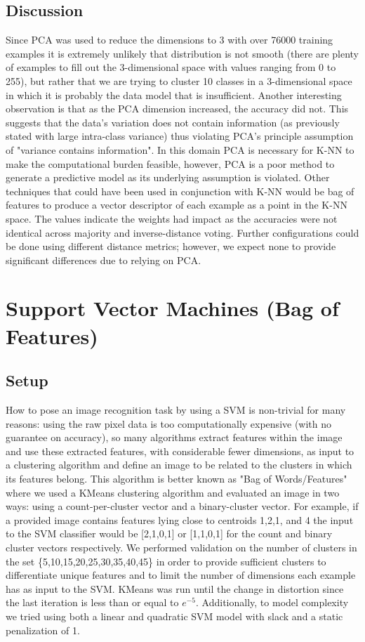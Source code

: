 \documentclass{article} %
\begin{document}
\subsection{Discussion}
Since PCA was used to reduce the dimensions to 3 with over 76000 training examples it is extremely unlikely that distribution is not smooth (there are plenty of examples to fill out the 3-dimensional space with values ranging from 0 to 255), but rather that we are trying to cluster 10 classes in a 3-dimensional space in which it is probably the data model that is insufficient. Another interesting observation is that as the PCA dimension increased, the accuracy did not. This suggests that the data's variation does not contain information (as previously stated with large intra-class variance) thus violating PCA's principle assumption of "variance contains information". In this domain PCA is necessary for K-NN to make the computational burden feasible, however, PCA is a poor method to generate a predictive model as its underlying assumption is violated. Other techniques that could have been used in conjunction with K-NN would be bag of features to produce a vector descriptor of each example as a point in the K-NN space. The values indicate the weights had impact as the accuracies were not identical across majority and inverse-distance voting. Further configurations could be done using different distance metrics; however, we expect none to provide significant differences due to relying on PCA. 

\section{Support Vector Machines (Bag of Features)}

\subsection{Setup}
How to pose an image recognition task by using a SVM is non-trivial for many reasons: using the raw pixel data is too computationally expensive (with no guarantee on accuracy), so many algorithms extract features within the image and use these extracted features, with considerable fewer dimensions, as input to a clustering algorithm and define an image to be related to the clusters in which its features belong.  This algorithm is better known as "Bag of Words/Features" where we used a KMeans clustering algorithm and evaluated an image in two ways: using a count-per-cluster vector and a binary-cluster vector.  For example, if a provided image contains features lying close to centroids 1,2,1, and 4 the input to the SVM classifier would be [2,1,0,1] or [1,1,0,1] for the count and binary cluster vectors respectively.  We performed validation on the number of clusters in the set \{5,10,15,20,25,30,35,40,45\} in order to provide sufficient clusters to differentiate unique features and to limit the number of dimensions each example has as input to the SVM. KMeans was run until the change in distortion since the last iteration is less than or equal to $e^{-5}$. Additionally, to model complexity we tried using both a linear and quadratic SVM model with slack and a static penalization of 1.
\end{document}
